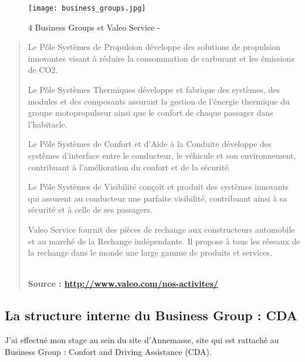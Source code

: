  \begin{figure}[H]
    \centering
    \texttt{[image: business\_groups.jpg]}
	\caption{4 Business Groups et Valeo Service - \cite{image.businessgroups.source} }\label{image.businessgroups} 
\end{figure}

\begin{quotation}
\begin{itshape}
Le Pôle Systèmes de Propulsion développe des solutions de propulsion innovantes visant à réduire la consommation de carburant et les émissions de CO2.\\
	\vspace{3mm}

Le Pôle Systèmes Thermiques développe et fabrique des systèmes, des modules et des composants assurant la gestion de l’énergie thermique du groupe motopropulseur ainsi que le confort de chaque passager dans l’habitacle.\\
	\vspace{3mm}

Le Pôle Systèmes de Confort et d’Aide à la Conduite développe des systèmes d’interface entre le conducteur, le véhicule et son environnement, contribuant à l’amélioration du confort et de la sécurité.\\
	\vspace{3mm}

Le Pôle Systèmes de Visibilité conçoit et produit des systèmes innovants qui assurent au conducteur une parfaite visibilité, contribuant ainsi à sa sécurité et à celle de ses passagers.\\
	\vspace{3mm}

Valeo Service fournit des pièces de rechange aux constructeurs automobile et au marché de la Rechange indépendante. Il propose à tous les réseaux de la rechange dans le monde une large gamme de produits et services.\\	
\end{itshape}\\
\textbf{Source : \url{http://www.valeo.com/nos-activites/}}

\end{quotation}

\subsection{La structure interne du Business Group : CDA}

J'ai effectué mon stage au sein du site d'Annemasse, site qui est rattaché au Business Group : Confort and Driving Assistance (CDA).\\
	\vspace{3mm}
	
